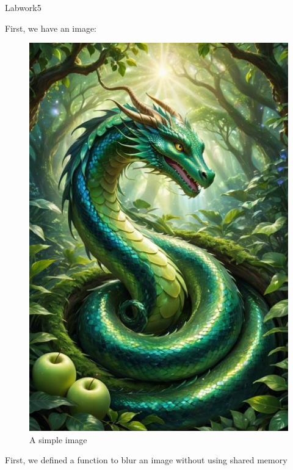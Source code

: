 \documentclass[12pt]{article}
\begin{document}
\begin{center}
    \vspace*{1.8cm}
    \Large
    Labwork5\\
\end{center}

\noindent
First, we have an image:
\begin{figure}[H]
\centering
    \includegraphics[height = 0.5\textheight, keepaspectratio]{images/image.jpeg}
    \caption{A simple image}
\end{figure}

\noindent
First, we defined a function to blur an image without using shared memory
\end{document}
